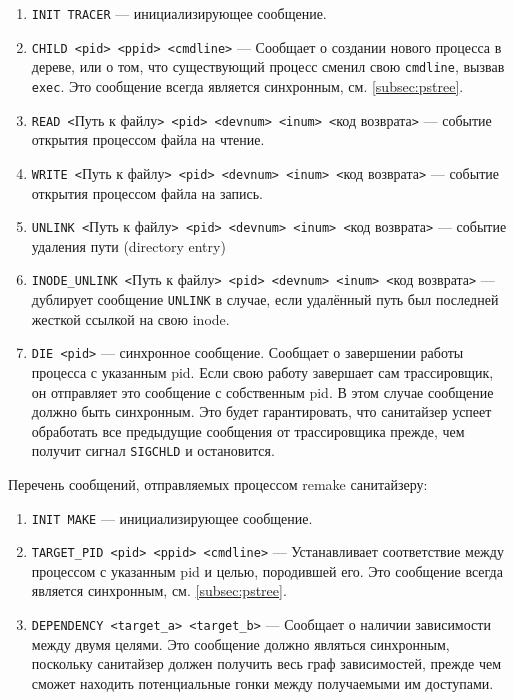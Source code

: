 \begin{enumerate}
    \item \texttt{INIT TRACER} --- инициализирующее сообщение.
    \item \texttt{CHILD <pid> <ppid> <cmdline>} --- Сообщает о создании нового процесса в дереве, или о том, что существующий процесс сменил свою \texttt{cmdline}, вызвав \texttt{exec}. Это сообщение всегда является синхронным, см. \ref{subsec:pstree}.
    \item \texttt{READ <}Путь к файлу\texttt{> <pid> <devnum> <inum> <}код возврата\texttt{>} --- событие открытия процессом файла на чтение.
    \item \texttt{WRITE <}Путь к файлу\texttt{> <pid> <devnum> <inum> <}код возврата\texttt{>}
    --- событие открытия процессом файла на запись.
    \item \texttt{UNLINK <}Путь к файлу\texttt{> <pid> <devnum> <inum> <}код возврата\texttt{>} --- событие удаления пути (directory entry)
    \item \texttt{INODE\_UNLINK <}Путь к файлу\texttt{> <pid> <devnum> <inum> <}код возврата\texttt{>} --- дублирует сообщение \texttt{UNLINK} в случае, если удалённый путь был последней жесткой ссылкой на свою inode.
    \item \texttt{DIE <pid>} --- синхронное сообщение. Сообщает о завершении работы процесса с указанным pid. Если свою работу завершает сам трассировщик, он отправляет это сообщение с собственным pid. В этом случае сообщение должно быть синхронным. Это будет гарантировать, что санитайзер успеет обработать все предыдущие сообщения от трассировщика прежде, чем получит сигнал \texttt{SIGCHLD} и остановится.
\end{enumerate}

Перечень сообщений, отправляемых процессом remake санитайзеру:

\begin{enumerate}
    \item \texttt{INIT MAKE} --- инициализирующее сообщение.
    \item \texttt{TARGET\_PID <pid> <ppid> <cmdline>} --- Устанавливает соответствие между процессом с указанным pid и целью, породившей его. Это сообщение всегда является синхронным, см. \ref{subsec:pstree}.
    \item \texttt{DEPENDENCY <target\_a> <target\_b>} --- Сообщает о наличии зависимости между двумя целями. Это сообщение должно являться синхронным, поскольку санитайзер должен получить весь граф зависимостей, прежде чем сможет находить потенциальные гонки между получаемыми им доступами.
\end{enumerate}

